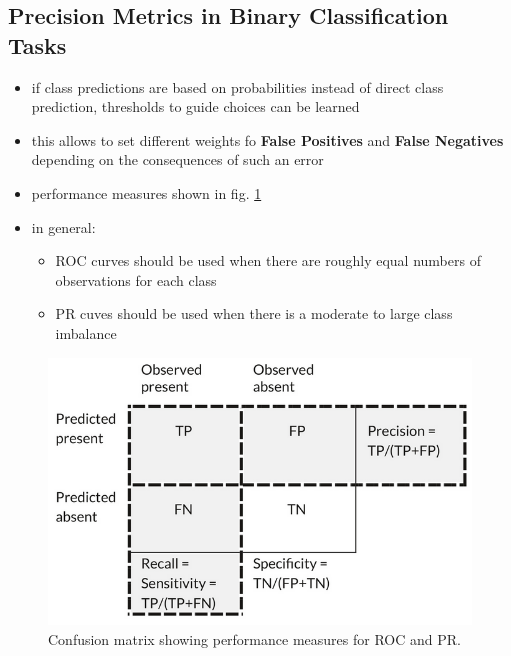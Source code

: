 \documentclass[12pt,a4paper]{article}
\begin{document}
\subsection{Precision Metrics in Binary Classification Tasks} %
\label{sub:precision_metrics_in_binary_classification_tasks}
\begin{itemize}
  \item if class predictions are based on probabilities instead of direct class prediction, thresholds to guide choices can be learned
  \item this allows to set different weights fo \textbf{False Positives} and \textbf{False Negatives} depending on the consequences of such an error
  \item performance measures shown in fig. \ref{fig:roc_pr}
  \item in general: 
  \begin{itemize}
    \item ROC curves should be used when there are roughly equal numbers of observations for each class
    \item PR cuves should be used when there is a moderate to large class imbalance
  \end{itemize}
\end{itemize}
\begin{figure}
  \centering
  \includegraphics[width=.5\linewidth]{Images/ROC_PR.png}
  \caption[Confusion matrix showing performance measures for ROC and PR]{Confusion matrix showing performance measures for ROC and PR. }
  \label{fig:roc_pr}
\end{figure}
\end{document}
